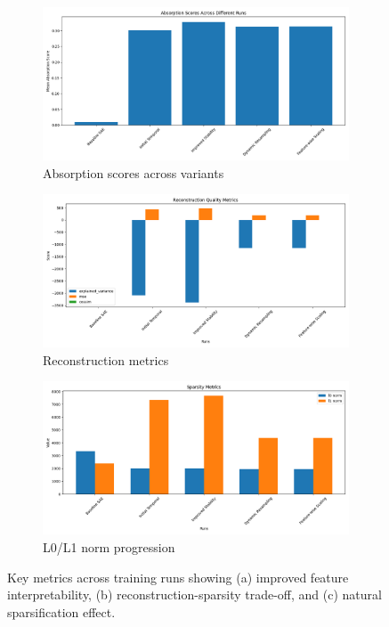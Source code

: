 \documentclass{article} %
\begin{document}
\begin{figure}[h]
    \centering
    \begin{subfigure}{0.32\textwidth}
        \includegraphics[width=\textwidth]{absorption_scores.png}
        \caption{Absorption scores across variants}
        \label{fig:absorption}
    \end{subfigure}
    \hfill
    \begin{subfigure}{0.32\textwidth}
        \includegraphics[width=\textwidth]{reconstruction_quality.png}
        \caption{Reconstruction metrics}
        \label{fig:reconstruction}
    \end{subfigure}
    \hfill
    \begin{subfigure}{0.32\textwidth}
        \includegraphics[width=\textwidth]{sparsity_metrics.png}
        \caption{L0/L1 norm progression}
        \label{fig:sparsity}
    \end{subfigure}
    \caption{Key metrics across training runs showing (a) improved feature interpretability, (b) reconstruction-sparsity trade-off, and (c) natural sparsification effect.}
    \label{fig:metrics}
\end{figure}
\end{document}
